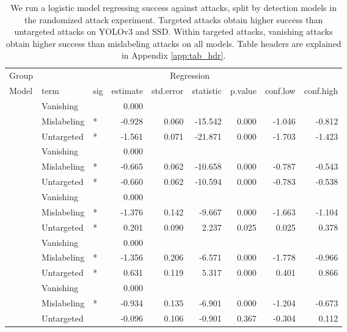 \documentclass[
]{article}
\begin{document}
\begingroup\fontsize{9}{11}\selectfont

\begin{longtable}[t]{lllrrrrrr}
\caption{\label{tab:target_untarget_vanish_mislabel_table}We run a logistic model regressing success against attacks, split by detection models in the randomized attack experiment. Targeted attacks obtain higher success than untargeted attacks on YOLOv3 and SSD. Within targeted attacks, vanishing attacks obtain higher success than mislabeling attacks on all models. Table headers are explained in Appendix \ref{app:tab_hdr}.}\\
\toprule
\multicolumn{1}{c}{Group} & \multicolumn{8}{c}{Regression} \\
\cmidrule(l{3pt}r{3pt}){1-1} \cmidrule(l{3pt}r{3pt}){2-9}
Model & term & sig & estimate & std.error & statistic & p.value & conf.low & conf.high\\
\midrule
 & Vanishing &  & 0.000 &  &  &  &  & \\
\cmidrule{2-9}\nopagebreak
 & Mislabeling & * & -0.928 & 0.060 & -15.542 & 0.000 & -1.046 & -0.812\\
\cmidrule{2-9}\nopagebreak
\multirow{-3}{*}{\raggedright\arraybackslash YOLOv3} & Untargeted & * & -1.561 & 0.071 & -21.871 & 0.000 & -1.703 & -1.423\\
\cmidrule{1-9}\pagebreak[0]
 & Vanishing &  & 0.000 &  &  &  &  & \\
\cmidrule{2-9}\nopagebreak
 & Mislabeling & * & -0.665 & 0.062 & -10.658 & 0.000 & -0.787 & -0.543\\
\cmidrule{2-9}\nopagebreak
\multirow{-3}{*}{\raggedright\arraybackslash SSD} & Untargeted & * & -0.660 & 0.062 & -10.594 & 0.000 & -0.783 & -0.538\\
\cmidrule{1-9}\pagebreak[0]
 & Vanishing &  & 0.000 &  &  &  &  & \\
\cmidrule{2-9}\nopagebreak
 & Mislabeling & * & -1.376 & 0.142 & -9.667 & 0.000 & -1.663 & -1.104\\
\cmidrule{2-9}\nopagebreak
\multirow{-3}{*}{\raggedright\arraybackslash RetinaNet} & Untargeted & * & 0.201 & 0.090 & 2.237 & 0.025 & 0.025 & 0.378\\
\cmidrule{1-9}\pagebreak[0]
 & Vanishing &  & 0.000 &  &  &  &  & \\
\cmidrule{2-9}\nopagebreak
 & Mislabeling & * & -1.356 & 0.206 & -6.571 & 0.000 & -1.778 & -0.966\\
\cmidrule{2-9}\nopagebreak
\multirow{-3}{*}{\raggedright\arraybackslash Faster R-CNN} & Untargeted & * & 0.631 & 0.119 & 5.317 & 0.000 & 0.401 & 0.866\\
\cmidrule{1-9}\pagebreak[0]
 & Vanishing &  & 0.000 &  &  &  &  & \\
\cmidrule{2-9}\nopagebreak
 & Mislabeling & * & -0.934 & 0.135 & -6.901 & 0.000 & -1.204 & -0.673\\
\cmidrule{2-9}\nopagebreak
\multirow{-3}{*}{\raggedright\arraybackslash Cascade R-CNN} & Untargeted &  & -0.096 & 0.106 & -0.901 & 0.367 & -0.304 & 0.112\\
\bottomrule
\end{longtable}
\endgroup{}
\end{document}
